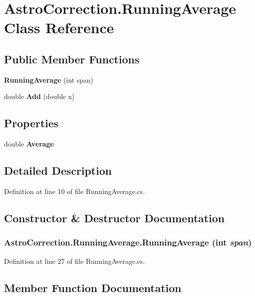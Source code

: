 \section{AstroCorrection.RunningAverage Class Reference}
\label{class_astro_correction_1_1_running_average}
\subsection*{Public Member Functions}
\begin{DoxyCompactItemize}
\item 
{\bf RunningAverage} (int span)
\item 
double {\bf Add} (double x)
\end{DoxyCompactItemize}
\subsection*{Properties}
\begin{DoxyCompactItemize}
\item 
double {\bf Average}\hspace{0.3cm}{\ttfamily  [get]}
\end{DoxyCompactItemize}


\subsection{Detailed Description}


Definition at line 10 of file RunningAverage.cs.

\subsection{Constructor \& Destructor Documentation}
\subsubsection[{RunningAverage}]{\setlength{\rightskip}{0pt plus 5cm}AstroCorrection.RunningAverage.RunningAverage (int {\em span})}\label{class_astro_correction_1_1_running_average_a274a4e739c8b92098d45987afb139459}


Definition at line 27 of file RunningAverage.cs.

\subsection{Member Function Documentation}
